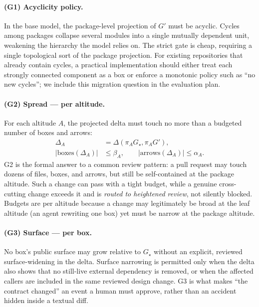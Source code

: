 \documentclass[sigconf,review,anonymous]{acmart}
\theoremstyle{plain}
\theoremstyle{definition}
\begin{document}
\paragraph{(G1) Acyclicity policy.}
In the base model, the package-level projection of $G'$ must be acyclic. Cycles
among packages collapse several modules into a single mutually dependent unit,
weakening the hierarchy the model relies on. The strict gate is cheap, requiring
a single topological sort of the package projection. For existing repositories
that already contain cycles, a practical implementation should either treat each
strongly connected component as a box or enforce a monotonic policy such as ``no
new cycles''; we include this migration question in the evaluation plan.

\paragraph{(G2) Spread --- per altitude.}
For each altitude $A$, the projected delta must touch no more than a budgeted
number of boxes and arrows:
\[
\begin{aligned}
\Delta_A &= \Delta(\pi_A G_\star, \pi_A G'),\\
|\text{boxes}(\Delta_A)| &\le \beta_A,\qquad
|\text{arrows}(\Delta_A)| \le \alpha_A .
\end{aligned}
\]
G2 is the formal answer to a common review pattern: a pull request may touch
dozens of files, boxes, and arrows, but still be self-contained at the package
altitude. Such a change can pass with a tight budget, while a genuine
cross-cutting change exceeds it and is \emph{routed to heightened review}, not
silently blocked. Budgets are per altitude because a change may legitimately be
broad at the leaf altitude (an agent rewriting one box) yet must be narrow at
the package altitude.

\paragraph{(G3) Surface --- per box.}
No box's public surface may grow relative to $G_\star$ without an explicit,
reviewed surface-widening in the delta. Surface narrowing is permitted only when
the delta also shows that no still-live external dependency is removed, or when
the affected callers are included in the same reviewed design change. G3 is what
makes ``the contract changed'' an event a human must approve, rather than an
accident hidden inside a textual diff.
\end{document}
